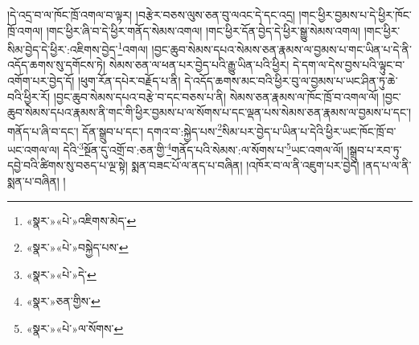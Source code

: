 །དེ་འདྲ་བ་ལ་ཁོང་ཁྲོ་འགལ་བ་ལྟར། །བརྩེར་བཅས་ལུས་ཅན་བུ་ལའང་དེ་དང་འདྲ། །གང་ཕྱིར་བྱམས་པ་དེ་ཕྱིར་ཁོང་ཁྲོ་འགལ། །གང་ཕྱིར་ཞི་བ་དེ་ཕྱིར་གནོད་སེམས་འགལ། །གང་ཕྱིར་དོན་བྱེད་དེ་ཕྱིར་སྒྱུ་སེམས་འགལ། །གང་ཕྱིར་སིམ་བྱེད་དེ་ཕྱིར་:འཇིགས་བྱེད་\footnote{«སྣར་»«པེ་»འཇིགས་མེད་}འགལ། །བྱང་ཆུབ་སེམས་དཔའ་སེམས་ཅན་རྣམས་ལ་བྱམས་པ་གང་ཡིན་པ་དེ་ནི་འདོད་ཆགས་སུ་དགོངས་ཏེ། སེམས་ཅན་ལ་ཕན་པར་བྱེད་པའི་རྒྱུ་ཡིན་པའི་ཕྱིར། དེ་དག་ལ་དེས་བྱས་པའི་ལྟུང་བ་འགོག་པར་བྱེད་དོ། །ཕུག་རོན་དཔེར་བརྗོད་པ་ནི། དེ་འདོད་ཆགས་མང་བའི་ཕྱིར་བུ་ལ་བྱམས་པ་ཡང་ཤིན་ཏུ་ཆེ་བའི་ཕྱིར་རོ། །བྱང་ཆུབ་སེམས་དཔའ་བརྩེ་བ་དང་བཅས་པ་ནི། སེམས་ཅན་རྣམས་ལ་ཁོང་ཁྲོ་བ་འགལ་ལོ། །བྱང་ཆུབ་སེམས་དཔའ་རྣམས་ནི་གང་གི་ཕྱིར་བྱམས་པ་ལ་སོགས་པ་དང་ལྡན་པས་སེམས་ཅན་རྣམས་ལ་བྱམས་པ་དང་། གནོད་པ་ཞི་བ་དང་། དོན་སྒྲུབ་པ་དང་། དགའ་བ་:སྐྱེད་པས་\footnote{«སྣར་»«པེ་»བསྐྱེད་པས་}སིམ་པར་བྱེད་པ་ཡིན་པ་དེའི་ཕྱིར་ཡང་ཁོང་ཁྲོ་བ་ཡང་འགལ་ལ། དེའི་\footnote{«སྣར་»«པེ་»དེ་}སྔོན་དུ་འགྲོ་བ་:ཅན་གྱི་\footnote{«སྣར་»ཅན་གྱིས་}གནོད་པའི་སེམས་:ལ་སོགས་པ་\footnote{«སྣར་»«པེ་»ལ་སོགས་}ཡང་འགལ་ལོ། །སྒྲུབ་པ་རབ་ཏུ་དབྱེ་བའི་ཚིགས་སུ་བཅད་པ་ལྔ་སྟེ། སྨན་བཟང་པོ་ལ་ནད་པ་བཞིན། །འཁོར་བ་ལ་ནི་འཇུག་པར་བྱེད། །ནད་པ་ལ་ནི་སྨན་པ་བཞིན། །
